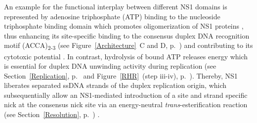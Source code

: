 An example for the functional interplay between different NS1 domains is represented by adenosine triphosphate (ATP) binding to the nucleoside triphosphate binding domain which promotes oligomerization of NS1 proteins \cite{pmid8372437}, thus enhancing its site-specific binding to the consensus duplex DNA recognition motif (ACCA)\textsubscript{2-3} (see Figure~\ref{Architecture}~C and D, p.~\pageref{Architecture}) \cite{pmid7853501} and contributing to its cytotoxic potential \cite{pmid2144594, pmid8317090, pmid11112491}. In contrast, hydrolysis of bound ATP releases energy \cite{pmid1833878} which is essential for duplex DNA unwinding activity \cite{pmid2159383, pmid1833878, pmid7853520, pmid7747462} during replication (see Section~\ref{Replication}, p.~\pageref{Replication} and Figure~\ref{RHR}~(step iii-iv), p.~\pageref{RHR}). Thereby, NS1 liberates separated ssDNA strands of the duplex replication origin, which subsequentially allow an NS1-mediated introduction of a site and strand specific nick at the consensus nick site via an energy-neutral \textit{trans}-esterification reaction (see Section~\ref{Resolution}, p.~\pageref{Resolution}) \cite{pmid2173787, pmid10516041, pmid11390575}.



